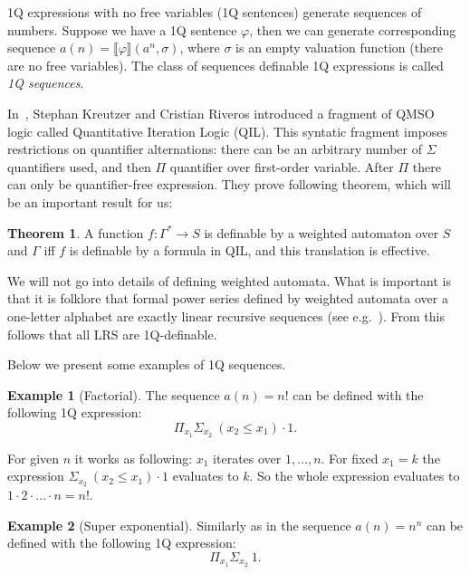 \documentclass[12pt]{article}
\theoremstyle{definition}
\newtheorem{theorem}{Theorem}[section]
\newtheorem{example}{Example}[section]
\begin{document}
1Q expressions with no free variables (1Q sentences) generate sequences of numbers. Suppose we have a 1Q sentence $\varphi$, then we can generate corresponding sequence $a(n) = \llbracket \varphi \rrbracket (a^n, \sigma)$, where $\sigma$ is an empty valuation function (there are no free variables). The class of sequences definable 1Q expressions is called \emph{1Q sequences}.

In~\cite[Section IV]{KreutzerR13}, Stephan Kreutzer and Cristian Riveros introduced a fragment of QMSO logic called Quantitative Iteration Logic (QIL). This syntatic fragment imposes restrictions on quantifier alternations: there can be an arbitrary number of $\Sigma$ quantifiers used, and then $\Pi$ quantifier over first-order variable. After $\Pi$ there can only be quantifier-free expression. They prove following theorem, which will be an important result for us:

\begin{theorem}
\label{QILWL}
    A function $f: \Gamma^* \rightarrow S$ is definable by a weighted automaton over $S$ and $\Gamma$ iff $f$ is definable by a formula in QIL, and this translation is effective.
\end{theorem}

We will not go into details of defining weighted automata. What is important is that it is folklore that formal power series defined by weighted automata over a one-letter alphabet are exactly linear recursive sequences (see e.g.~\cite{BarloyFLM22}). From this follows that all LRS are 1Q-definable.

Below we present some examples of 1Q sequences.

\begin{example}[Factorial]
\label{ExSeqFactorial}
    The sequence $a(n) = n!$ can be defined with the following 1Q expression: 
    $$\Pi_{x_1}\Sigma_{x_2} \ (x_2 \leq x_1) \cdot 1.$$

    For given $n$ it works as following: $x_1$ iterates over $1,\ldots,n$. For fixed $x_1 = k$ the expression $\Sigma_{x_2} \ (x_2 \leq x_1) \cdot 1$ evaluates to $k$. So the whole expression evaluates to $1 \cdot 2 \cdot \ldots \cdot n = n!$.
\end{example}

\begin{example}[Super exponential]
\label{ExSeqNToN}
    Similarly as in  the sequence $a(n) = n^n$ can be defined with the following 1Q expression:
    $$\Pi_{x_1}\Sigma_{x_2} \ 1.$$
\end{example}
\end{document}

